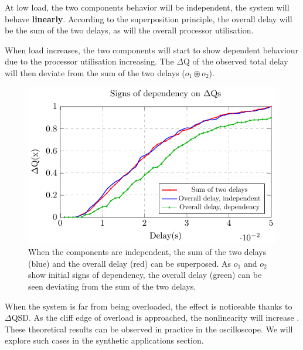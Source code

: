         At low load, the two components behavior will be independent, the system will behave \textbf{linearly}. According to the superposition principle, the overall delay will be the sum of the two delays, as will the overall processor utilisation. \cite{sup-p}
        
        When load increases, the two components will start to show dependent behaviour due to the processor utilisation increasing. The $\Delta$Q of the observed total delay will then deviate from the sum of the two delays ($o_1 \circledast o_2$). 
        
        \begin{figure}[H]
            \begin{center}
                \includegraphics[scale=1]{tikz/cdf_indep.pdf}
            \end{center}
            \caption{When the components are independent, the sum of the two delays (blue) and the overall delay (red) can be superposed. As $o_1$ and $o_2$ show initial signs of dependency, the overall delay (green) can be seen deviating from the sum of the two delays.}
            \label{fig:cdf_indep}
        \end{figure}

        When the system is far from being overloaded, the effect is noticeable thanks to $\Delta$QSD. As the cliff edge of overload is approached, the nonlinearity will increase \cite{post}. These theoretical results can be observed in practice in the oscilloscope. We will explore such cases in the synthetic applications section.
